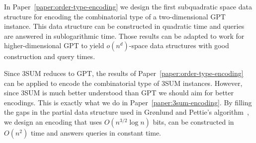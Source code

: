 In Paper~\ref{paper:order-type-encoding} we design the first subquadratic space
data structure for encoding the combinatorial type of a two-dimensional GPT
instance. This data structure can be constructed in quadratic time and queries
are answered in sublogarithmic time. Those results can be adapted to work for
higher-dimensional GPT to yield \(o(n^d)\)-space data structures with good
construction and query times.

Since 3SUM reduces to GPT, the results of Paper~\ref{paper:order-type-encoding}
can be applied to encode the combinatorial type of 3SUM instances. However,
since 3SUM is much better understood than GPT we should aim for better
encodings. This is exactly what we do in Paper~\ref{paper:3sum-encoding}.
By filling the gaps in the partial data structure used in Gr\o nlund and
Pettie's algorithm~\cite{GP18}, we design an encoding that uses \(O(n^{3/2}
\log n)\) bits, can be constructed in \(O(n^2)\) time and answers queries in
constant time.
